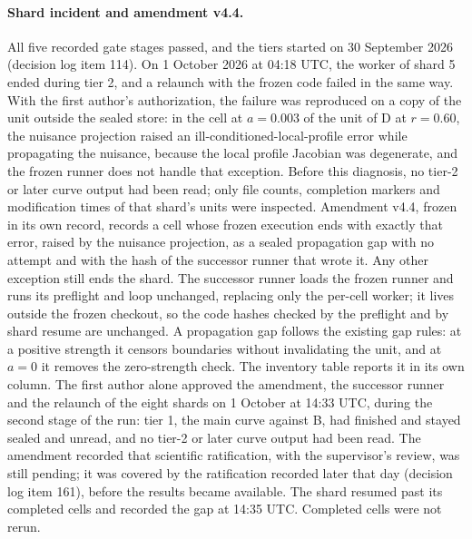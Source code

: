 \paragraph{Shard incident and amendment v4.4.}
All five recorded gate stages passed, and the tiers started on 30 September 2026 (decision log item 114). On 1 October 2026 at 04:18 UTC, the worker of shard 5 ended during tier 2, and a relaunch with the frozen code failed in the same way. With the first author's authorization, the failure was reproduced on a copy of the unit outside the sealed store: in the cell at $a=0.003$ of the unit of D at $r=0.60$, the nuisance projection raised an ill-conditioned-local-profile error while propagating the nuisance, because the local profile Jacobian was degenerate, and the frozen runner does not handle that exception. Before this diagnosis, no tier-2 or later curve output had been read; only file counts, completion markers and modification times of that shard's units were inspected. %
Amendment v4.4, frozen in its own record, records a cell whose frozen execution ends with exactly that error, raised by the nuisance projection, as a sealed propagation gap with no attempt and with the hash of the successor runner that wrote it. Any other exception still ends the shard. The successor runner loads the frozen runner and runs its preflight and loop unchanged, replacing only the per-cell worker; it lives outside the frozen checkout, so the code hashes checked by the preflight and by shard resume are unchanged. A propagation gap follows the existing gap rules: at a positive strength it censors boundaries without invalidating the unit, and at $a=0$ it removes the zero-strength check. The inventory table reports it in its own column. %
The first author alone approved the amendment, the successor runner and the relaunch of the eight shards on 1 October at 14:33 UTC, during the second stage of the run: tier 1, the main curve against B, had finished and stayed sealed and unread, and no tier-2 or later curve output had been read. The amendment recorded that scientific ratification, with the supervisor's review, was still pending; it was covered by the ratification recorded later that day (decision log item 161), before the results became available. The shard resumed past its completed cells and recorded the gap at 14:35 UTC. Completed cells were not rerun. %
